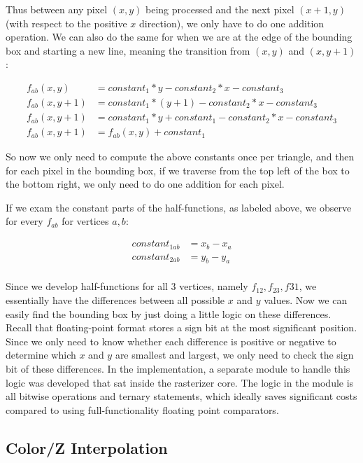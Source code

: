 \documentclass[letterpaper,10pt]{article}
\begin{document}
Thus between any pixel $(x,y)$ being processed and the next pixel $(x+1,y)$ (with respect to the positive $x$ direction), we only have to do one addition operation. We can also do the same for when we are at the edge of the bounding box and starting a new line, meaning the transition from $(x,y)$ and $(x, y+1)$:

\begin{align*}
    f_{ab}(x,y) &= constant_{1}*y-constant_{2}*x- constant_{3}					\\
    f_{ab}(x,y+1) &= constant_{1}*(y+1)-constant_{2}*x- constant_{3}				\\
    f_{ab}(x,y+1) &= constant_{1}*y+constant_{1}-constant_{2}*x- constant_{3} 		\\
    f_{ab}(x,y+1) &= f_{ab}(x,y) + constant_{1}	
\end{align*}

So now we only need to compute the above constants once per triangle, and then for each pixel in the bounding box, if we traverse from the top left of the box to the bottom right, we only need to do one addition for each pixel.

If we exam the constant parts of the half-functions, as labeled above, we observe for every $f_{ab}$ for vertices $a,b$:

\begin{align*}
    constant_{1ab} &= x_{b}-x_{a}					\\
    constant_{2ab} &= y_{b}-y_{a}					\\
\end{align*}

Since we develop half-functions for all 3 vertices, namely $f_{12}, f_{23}, f{31}$, we essentially have the differences between all possible $x$ and $y$ values. Now we can easily find the bounding box by just doing a little logic on these differences. Recall that floating-point format stores a sign bit at the most significant position. Since we only need to know whether each difference is positive or negative to determine which $x$ and $y$ are smallest and largest, we only need to check the sign bit of these differences. In the implementation, a separate module to handle this logic was developed that sat inside the rasterizer core. The logic in the module is all bitwise operations and ternary statements, which ideally saves significant costs compared to using full-functionality floating point comparators.

\subsection{Color/Z Interpolation}
\end{document}

